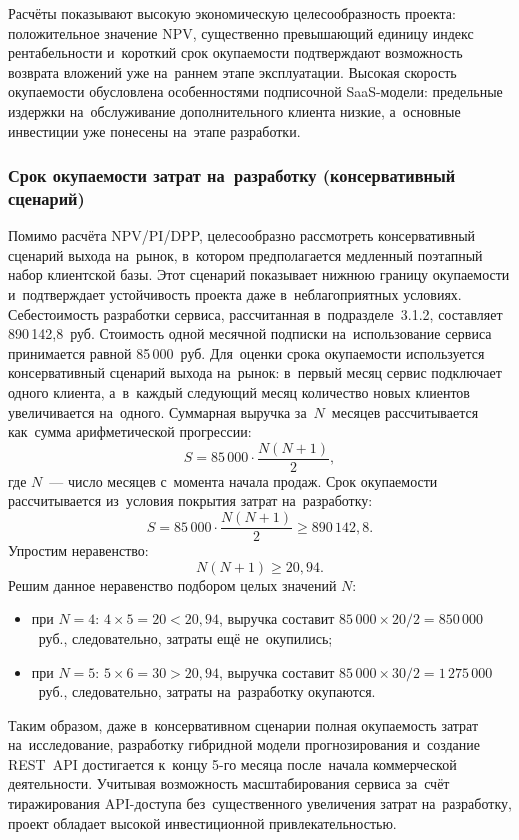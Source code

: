Расчёты показывают высокую экономическую целесообразность проекта:
положительное значение NPV, существенно превышающий единицу индекс
рентабельности и~короткий срок окупаемости подтверждают возможность возврата
вложений уже на~раннем этапе эксплуатации. Высокая скорость окупаемости
обусловлена особенностями подписочной SaaS-модели: предельные издержки
на~обслуживание дополнительного клиента низкие, а~основные инвестиции уже
понесены на~этапе разработки.

\subsubsection{Срок окупаемости затрат на~разработку (консервативный сценарий)}

Помимо расчёта NPV/PI/DPP, целесообразно рассмотреть консервативный сценарий
выхода на~рынок, в~котором предполагается медленный поэтапный набор клиентской
базы. Этот сценарий показывает нижнюю границу окупаемости и~подтверждает
устойчивость проекта даже в~неблагоприятных условиях. Себестоимость разработки
сервиса, рассчитанная в~подразделе~3.1.2, составляет 890\,142,8~руб. Стоимость
одной месячной подписки на~использование сервиса принимается равной
85\,000~руб. Для~оценки срока окупаемости используется консервативный сценарий
выхода на~рынок: в~первый месяц сервис подключает одного клиента, а~в~каждый
следующий месяц количество новых клиентов увеличивается на~одного. Суммарная
выручка за~$N$~месяцев рассчитывается как~сумма арифметической прогрессии:
\[ S = 85\,000 \cdot \frac{N(N+1)}{2}, \]
где $N$~--- число месяцев с~момента начала продаж. Срок окупаемости
рассчитывается из~условия покрытия затрат на~разработку:
\[ S = 85\,000 \cdot \frac{N(N+1)}{2} \ge 890\,142{,}8. \]
Упростим неравенство:
\[ N(N+1) \ge 20{,}94. \]
Решим данное неравенство подбором целых значений $N$:

\begin{itemize}[nosep]
  \item при $N = 4$: $4 \times 5 = 20 < 20{,}94$, выручка составит $85\,000 \times 20 / 2 = 850\,000$~руб., следовательно, затраты ещё не~окупились;
  \item при $N = 5$: $5 \times 6 = 30 > 20{,}94$, выручка составит $85\,000 \times 30 / 2 = 1\,275\,000$~руб., следовательно, затраты на~разработку окупаются.
\end{itemize}

Таким образом, даже в~консервативном сценарии полная окупаемость затрат
на~исследование, разработку гибридной модели прогнозирования и~создание
REST~API достигается к~концу 5-го месяца после~начала коммерческой
деятельности. Учитывая возможность масштабирования сервиса за~счёт
тиражирования API-доступа без~существенного увеличения затрат на~разработку,
проект обладает высокой инвестиционной привлекательностью.


